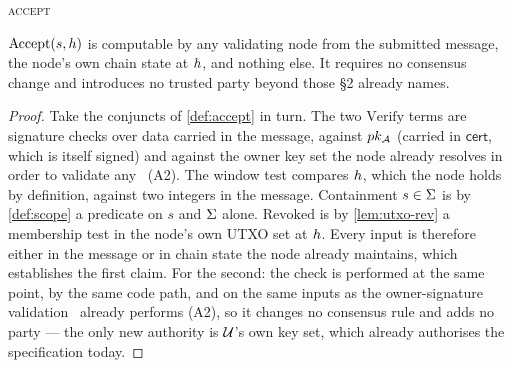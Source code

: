 \begin{algorithm}[H]
\DontPrintSemicolon
{}
\Return \textsc{accept}\;
\caption{\textsc{AcceptDelegatedSpec}. \textbf{Failure mode:} every branch fails closed. A node that
cannot evaluate $\mathsf{rev} \in U(\hgt)$ --- for instance one whose local state does not reach the
anchor's height --- rejects rather than accepts, so a partially-synced node under-accepts and never
over-accepts. \planned}
\label{alg:accept}
\end{algorithm}

\begin{property}
\label{prop:local}
$\mathrm{Accept}(s,h)$ is computable by any validating node from the submitted message, the
node's own chain state at $h$, and nothing else. It requires no consensus change and introduces
no trusted party beyond those \S2 already names.
\end{property}

\begin{proof}
Take the conjuncts of \cref{def:accept} in turn. The two $\mathrm{Verify}$ terms are signature checks
over data carried in the message, against $pk_{\mathcal{A}}$ (carried in $\mathsf{cert}$, which is itself
signed) and against the owner key set the node already resolves in order to validate any \appspec\
(A2). The window test compares $h$, which the node holds by definition, against two integers in
the message. Containment $s \in \Sigma$ is by \cref{def:scope} a predicate on $s$ and $\Sigma$
alone. $\mathrm{Revoked}$ is by \cref{lem:utxo-rev} a membership test in the node's own UTXO set at
$h$. Every input is therefore either in the message or in chain state the node already maintains,
which establishes the first claim. For the second: the check is performed at the same point, by the
same code path, and on the same inputs as the owner-signature validation \FluxOS\ already performs
(A2), so it changes no consensus rule and adds no party --- the only new authority is $\mathcal{U}$'s
own key set, which already authorises the specification today. \qedhere
\end{proof}

